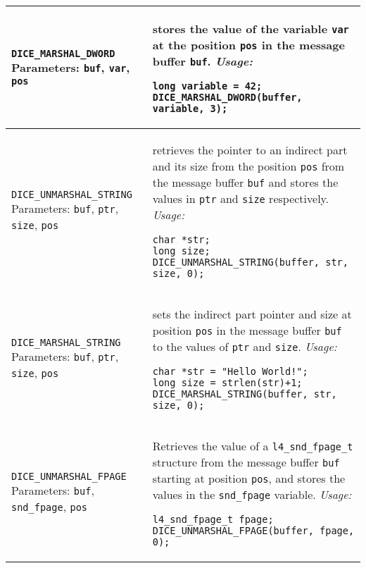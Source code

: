 {\begin{longtable}{|p{4.5cm}|p{9cm}|}
\verb|DICE_MARSHAL_DWORD|
\newline
Parameters: \verb|buf|, \verb|var|, \verb|pos| &
stores the value of the variable \verb|var| at the position \verb|pos|
in the message buffer \verb|buf|.
\newline
\it Usage:
\begin{verbatim}
long variable = 42;
DICE_MARSHAL_DWORD(buffer, variable, 3);
\end{verbatim}
\\ \hline

\verb|DICE_UNMARSHAL_STRING|
\newline
Parameters: \verb|buf|, \verb|ptr|, \verb|size|, \verb|pos| &
retrieves the pointer to an indirect part and its size 
from the position \verb|pos| from the message buffer \verb|buf|
and stores the values in \verb|ptr| and \verb|size| respectively.
\newline
\it Usage:
\begin{verbatim}
char *str;
long size;
DICE_UNMARSHAL_STRING(buffer, str, size, 0);
\end{verbatim}
\\ \hline

\verb|DICE_MARSHAL_STRING|
\newline
Parameters: \verb|buf|, \verb|ptr|, \verb|size|, \verb|pos| &
sets the indirect part pointer and size at position \verb|pos|
in the message buffer \verb|buf| to the values of \verb|ptr| and
\verb|size|.
\newline
\it Usage:
\begin{verbatim}
char *str = "Hello World!";
long size = strlen(str)+1;
DICE_MARSHAL_STRING(buffer, str, size, 0);
\end{verbatim}
\\ \hline

\verb|DICE_UNMARSHAL_FPAGE|
\newline
Parameters: \verb|buf|, \verb|snd_fpage|, \verb|pos| &
Retrieves the value of a \verb|l4_snd_fpage_t| structure from the
message buffer \verb|buf| starting at position \verb|pos|, and 
stores the values in the \verb|snd_fpage| variable.
\newline
\it Usage:
\begin{verbatim}
l4_snd_fpage_t fpage;
DICE_UNMARSHAL_FPAGE(buffer, fpage, 0);
\end{verbatim}
\\ \hline
						

\end{longtable}}
